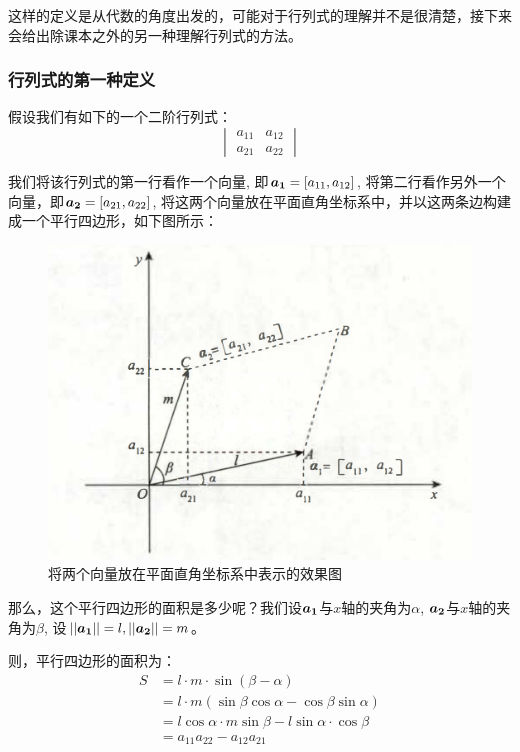 \documentclass[12pt, a4paper, oneside, UTF8]{ctexbook}
\begin{document}
这样的定义是从代数的角度出发的，可能对于行列式的理解并不是很清楚，接下来会给出除课本之外的另一种理解行列式的方法。
\subsubsection{行列式的第一种定义}
假设我们有如下的一个二阶行列式：
\[
    \begin{vmatrix}
    a_{11} & a_{12}\\
    a_{21} & a_{22}
    \end{vmatrix}
\]

我们将该行列式的第一行看作一个向量, 即$\boldsymbol{a_1}=\left[a_{11}, a_{12}\right]$, 将第二行看作另外一个向量，即$\boldsymbol{a_2}=\left[a_{21}, a_{22}\right]$, 将这两个向量放在平面直角坐标系中，并以这两条边构建成一个平行四边形，如下图所示：

\begin{figure}[htbp]
    \centering
    \includegraphics[scale=0.5]{../figure/平行四边形.png}
    \caption{将两个向量放在平面直角坐标系中表示的效果图}
\end{figure}

那么，这个平行四边形的面积是多少呢？我们设$\boldsymbol{a_1}$与$x$轴的夹角为$\alpha$, $\boldsymbol{a_2}$与$x$轴的夹角为$\beta$, 设$||\boldsymbol{a_1}|| = l, ||\boldsymbol{a_2}|| = m$。

则，平行四边形的面积为：
\[
  \begin{aligned}
    S &= l\cdot m\cdot\sin(\beta-\alpha)\\
    &= l\cdot m(\sin\beta\cos\alpha-\cos\beta\sin\alpha)\\
    &= l\cos\alpha\cdot m\sin\beta-l\sin\alpha\cdot\cos\beta\\
    &= a_{11}a_{22} - a_{12}a_{21}
  \end{aligned}  
\]
\end{document}
